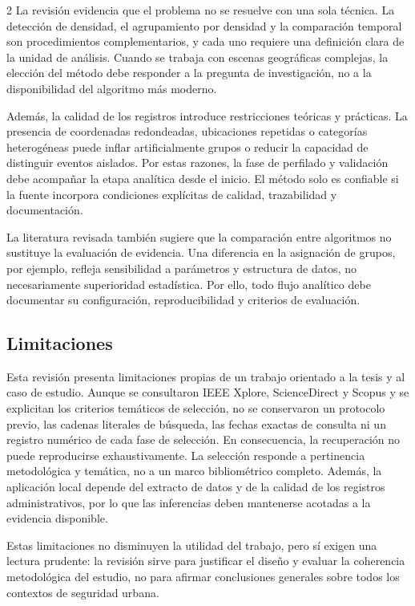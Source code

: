 \documentclass[10pt,twoside]{article}
\begin{document}
\begin{multicols}{2}
La revisión evidencia que el problema no se resuelve con una sola técnica. La detección de densidad, el agrupamiento por densidad y la comparación temporal son procedimientos complementarios, y cada uno requiere una definición clara de la unidad de análisis. Cuando se trabaja con escenas geográficas complejas, la elección del método debe responder a la pregunta de investigación, no a la disponibilidad del algoritmo más moderno.

Además, la calidad de los registros introduce restricciones teóricas y prácticas. La presencia de coordenadas redondeadas, ubicaciones repetidas o categorías heterogéneas puede inflar artificialmente grupos o reducir la capacidad de distinguir eventos aislados. Por estas razones, la fase de perfilado y validación debe acompañar la etapa analítica desde el inicio. El método solo es confiable si la fuente incorpora condiciones explícitas de calidad, trazabilidad y documentación.

La literatura revisada también sugiere que la comparación entre algoritmos no sustituye la evaluación de evidencia. Una diferencia en la asignación de grupos, por ejemplo, refleja sensibilidad a parámetros y estructura de datos, no necesariamente superioridad estadística. Por ello, todo flujo analítico debe documentar su configuración, reproducibilidad y criterios de evaluación.

\subsection{Limitaciones}

Esta revisión presenta limitaciones propias de un trabajo orientado a la tesis y al caso de estudio. Aunque se consultaron IEEE Xplore, ScienceDirect y Scopus y se explicitan los criterios temáticos de selección, no se conservaron un protocolo previo, las cadenas literales de búsqueda, las fechas exactas de consulta ni un registro numérico de cada fase de selección. En consecuencia, la recuperación no puede reproducirse exhaustivamente. La selección responde a pertinencia metodológica y temática, no a un marco bibliométrico completo. Además, la aplicación local depende del extracto de datos y de la calidad de los registros administrativos, por lo que las inferencias deben mantenerse acotadas a la evidencia disponible.

Estas limitaciones no disminuyen la utilidad del trabajo, pero sí exigen una lectura prudente: la revisión sirve para justificar el diseño y evaluar la coherencia metodológica del estudio, no para afirmar conclusiones generales sobre todos los contextos de seguridad urbana.


\end{multicols}
\end{document}
